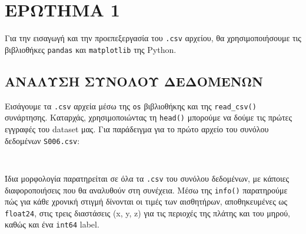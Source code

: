 \chapter{ΕΡΩΤΗΜΑ 1}
    Για την εισαγωγή και την προεπεξεργασία του \texttt{.csv} αρχείου, θα χρησιμοποιήσουμε τις βιβλιοθήκες \texttt{pandas} και \texttt{matplotlib} της Python.

    \section{ΑΝΑΛΥΣΗ ΣΥΝΟΛΟΥ ΔΕΔΟΜΕΝΩΝ}
        Εισάγουμε τα \texttt{.csv} αρχεία μέσω της \texttt{os} βιβλιοθήκης και της \texttt{read\_csv()} συνάρτησης.
        Καταρχάς, χρησιμοποιώντας τη \texttt{head()} μπορούμε να δούμε τις πρώτες εγγραφές του dataset μας.
        Για παράδειγμα για το πρώτο αρχείο του συνόλου δεδομένων \texttt{S006.csv}:

        \begin{table}[ht] \noindent\centering\tt
        \end{table}

        Ίδια μορφολογία παρατηρείται σε όλα τα \texttt{.csv} του συνόλου δεδομένων, με κάποιες διαφοροποιήσεις που θα αναλυθούν στη συνέχεια.
        Μέσω της \texttt{info()} παρατηρούμε πώς για κάθε χρονική στιγμή δίνονται οι τιμές των αισθητήρων, αποθηκευμένες ως \texttt{float24},
        στις τρεις διαστάσεις (x, y, z) για τις περιοχές της πλάτης και του μηρού, καθώς και ένα \texttt{int64} label.

